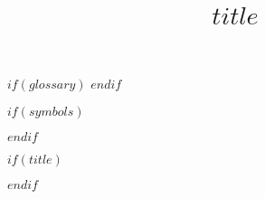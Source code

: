 \usepackage[nonumberlist,acronym,toc]{glossaries-extra}
$if(glossary)$
  \makeglossaries
$endif$

\usepackage[noprefix,intoc]{nomencl}
$if(symbols)$
  \makenomenclature
  
$endif$



$if(title)$
  \title{$title$}
$endif$

\renewcommand{\contentsname}{Table of contents}

\def\maketitle{
  \cleardoublepage
  \begin{titlepage}
    \pagenumbering{roman}
    \begin{center}
        {\huge $title$ \par}
        \vspace*{0.5in}

        {by\\}
        {$author$}
        \vspace*{1in}

        A dissertation\\
        submitted in partial fulfillment \\
        of the requirements for the degree of\\
        $degree$~in~$discipline$\\
        Boise State University
        \vspace*{0.5in}

        $date$
    \end{center}
  \end{titlepage}
  \let\maketitle\relax
}

